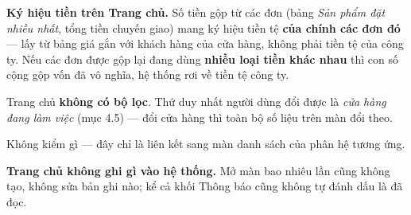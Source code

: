 \textbf{Ký hiệu tiền trên Trang chủ.} Số tiền gộp từ các đơn (bảng \emph{Sản phẩm đặt nhiều
nhất}, tổng tiền chuyến giao) mang ký hiệu tiền tệ \textbf{của chính các đơn đó} --- lấy từ bảng
giá gắn với khách hàng của cửa hàng, không phải tiền tệ của công ty. Nếu các đơn được gộp lại
đang dùng \textbf{nhiều loại tiền khác nhau} thì con số cộng gộp vốn đã vô nghĩa, hệ thống rơi
về tiền tệ công ty.

\mloc

Trang chủ \textbf{không có bộ lọc}. Thứ duy nhất người dùng đổi được là \emph{cửa hàng đang làm
việc} (mục 4.5) --- đổi cửa hàng thì toàn bộ số liệu trên màn đổi theo.


Không kiểm gì --- đây chỉ là liên kết sang màn danh sách của phân hệ tương ứng.

\mghi

\textbf{Trang chủ không ghi gì vào hệ thống.} Mở màn bao nhiêu lần cũng không tạo, không sửa
bản ghi nào; kể cả khối Thông báo cũng không tự đánh dấu là đã đọc.

\mhoi

